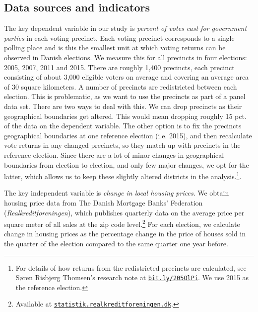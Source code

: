 \documentclass[12pt,a4paper]{article}
\begin{document}
\subsection{Data sources and indicators}
The key dependent variable in our study is \textit{percent of votes cast for government parties} in each voting precinct. Each voting precinct corresponds to a single polling place and is this the smallest unit at which voting returns can be observed in Danish elections. We measure this for all precincts in four elections:  2005, 2007, 2011 and 2015. There are roughly 1,400 precincts, each precinct consisting of about 3,000 eligible voters on average and covering an average area of 30 square kilometers. A number of precincts are redistricted between each election. This is problematic, as we want to use  the precincts as part of a panel data set. There are two ways to deal with this. We can drop precincts as their geographical boundaries get altered. This would mean dropping roughly 15 pct. of the data on the dependent variable. The other option is to fix the precincts geographical boundaries at one reference election (i.e. 2015), and then recalculate vote returns in any changed precincts, so they match up with precincts in the reference election. Since there are a lot of minor changes in geographical boundaries from election to election, and only few major changes, we opt for the latter, which allows us to keep these slightly altered districts in the analysis.\footnote{For details of how returns from the redistricted precincts are calculated, see Søren Risbjerg Thomsen's research note at \texttt{\href{http://bit.ly/205OlPi}{bit.ly/205OlPi}}.  We use 2015 as the reference election.}. 

The key independent variable is \textit{change in local housing prices}. We obtain housing price data from The Danish Mortgage Banks' Federation (\textit{Realkreditforeningen}), which publishes quarterly data on the average price per square meter of all sales at the zip code level.\footnote{Available at \texttt{\href{http://statistik.realkreditforeningen.dk/}{statistik.realkreditforeningen.dk}}.} For each election, we calculate change in housing prices as the percentage change in the price of houses sold in the quarter of the election compared to the same quarter one year before. 
\end{document}
